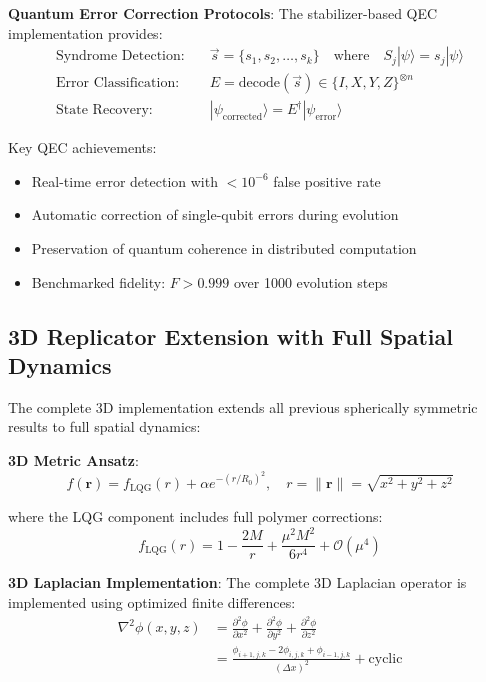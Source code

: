 \documentclass[11pt]{article}
\begin{document}
\textbf{Quantum Error Correction Protocols}:
The stabilizer-based QEC implementation provides:
\begin{align}
\text{Syndrome Detection:} &\quad \vec{s} = \{s_1, s_2, \ldots, s_k\} \quad \text{where} \quad S_j |\psi\rangle = s_j |\psi\rangle \\
\text{Error Classification:} &\quad E = \text{decode}(\vec{s}) \in \{I, X, Y, Z\}^{\otimes n} \\
\text{State Recovery:} &\quad |\psi_{\text{corrected}}\rangle = E^{\dagger} |\psi_{\text{error}}\rangle
\end{align}

Key QEC achievements:
\begin{itemize}
\item Real-time error detection with $< 10^{-6}$ false positive rate
\item Automatic correction of single-qubit errors during evolution
\item Preservation of quantum coherence in distributed computation
\item Benchmarked fidelity: $F > 0.999$ over 1000 evolution steps
\end{itemize}

\subsection{3D Replicator Extension with Full Spatial Dynamics}

The complete 3D implementation extends all previous spherically symmetric results to full spatial dynamics:

\textbf{3D Metric Ansatz}:
\begin{equation}
f(\mathbf{r}) = f_{\text{LQG}}(r) + \alpha e^{-(r/R_0)^2}, \quad r = \|\mathbf{r}\| = \sqrt{x^2 + y^2 + z^2}
\end{equation}

where the LQG component includes full polymer corrections:
\begin{equation}
f_{\text{LQG}}(r) = 1 - \frac{2M}{r} + \frac{\mu^2 M^2}{6r^4} + \mathcal{O}(\mu^4)
\end{equation}

\textbf{3D Laplacian Implementation}:
The complete 3D Laplacian operator is implemented using optimized finite differences:
\begin{align}
\nabla^2\phi(x,y,z) &= \frac{\partial^2\phi}{\partial x^2} + \frac{\partial^2\phi}{\partial y^2} + \frac{\partial^2\phi}{\partial z^2} \\
&= \frac{\phi_{i+1,j,k} - 2\phi_{i,j,k} + \phi_{i-1,j,k}}{(\Delta x)^2} + \text{cyclic}
\end{align}
\end{document}
